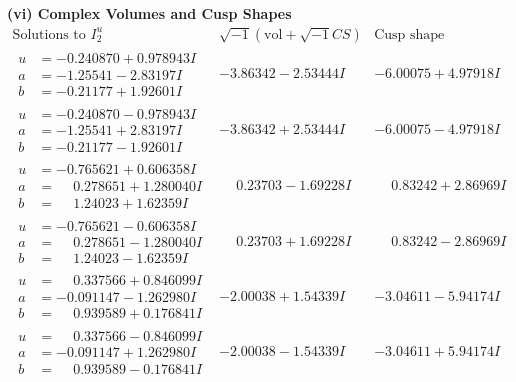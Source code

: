 \documentclass[1p]{elsarticle_modified}
\theoremstyle{definition}
\newcommand{\I}{\sqrt{-1}}
\begin{document}
\newpage\flushleft \textbf{(vi) Complex Volumes and Cusp Shapes}
$$\begin{array}{c|c|c}  
\text{Solutions to }I^u_{2}& \I (\text{vol} + \sqrt{-1}CS) & \text{Cusp shape}\\
 \hline 
\begin{aligned}
u &= -0.240870 + 0.978943 I \\
a &= -1.25541 - 2.83197 I \\
b &= -0.21177 + 1.92601 I\end{aligned}
 & -3.86342 - 2.53444 I & -6.00075 + 4.97918 I \\ \hline\begin{aligned}
u &= -0.240870 - 0.978943 I \\
a &= -1.25541 + 2.83197 I \\
b &= -0.21177 - 1.92601 I\end{aligned}
 & -3.86342 + 2.53444 I & -6.00075 - 4.97918 I \\ \hline\begin{aligned}
u &= -0.765621 + 0.606358 I \\
a &= \phantom{-}0.278651 + 1.280040 I \\
b &= \phantom{-}1.24023 + 1.62359 I\end{aligned}
 & \phantom{-}0.23703 - 1.69228 I & \phantom{-}0.83242 + 2.86969 I \\ \hline\begin{aligned}
u &= -0.765621 - 0.606358 I \\
a &= \phantom{-}0.278651 - 1.280040 I \\
b &= \phantom{-}1.24023 - 1.62359 I\end{aligned}
 & \phantom{-}0.23703 + 1.69228 I & \phantom{-}0.83242 - 2.86969 I \\ \hline\begin{aligned}
u &= \phantom{-}0.337566 + 0.846099 I \\
a &= -0.091147 - 1.262980 I \\
b &= \phantom{-}0.939589 + 0.176841 I\end{aligned}
 & -2.00038 + 1.54339 I & -3.04611 - 5.94174 I \\ \hline\begin{aligned}
u &= \phantom{-}0.337566 - 0.846099 I \\
a &= -0.091147 + 1.262980 I \\
b &= \phantom{-}0.939589 - 0.176841 I\end{aligned}
 & -2.00038 - 1.54339 I & -3.04611 + 5.94174 I \\ \hline\begin{aligned}

\end{aligned}
\end{array}$$
\end{document}
